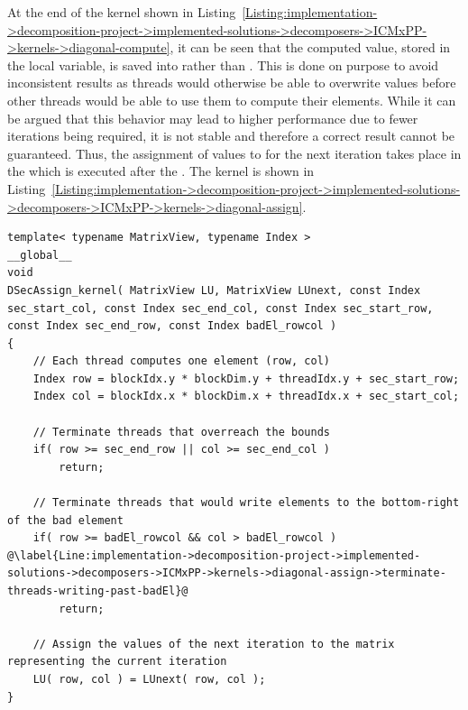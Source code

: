 At the end of the kernel shown in Listing~\ref{Listing:implementation->decomposition-project->implemented-solutions->decomposers->ICMxPP->kernels->diagonal-compute}, it can be seen that the computed value, stored in the  local variable, is saved into  rather than . This is done on purpose to avoid inconsistent results as threads would otherwise be able to overwrite values before other threads would be able to use them to compute their elements. While it can be argued that this behavior may lead to higher performance due to fewer iterations being required, it is not stable and therefore a correct result cannot be guaranteed. Thus, the assignment of values to  for the next iteration takes place in the  which is executed after the . The  kernel is shown in Listing~\ref{Listing:implementation->decomposition-project->implemented-solutions->decomposers->ICMxPP->kernels->diagonal-assign}.

\begin{lstlisting}[caption={The implementation of the \code{DSecAssign\_kernel()} kernel that assigns values of the next iteration to the matrix representing the current iteration. Note that the matrices are passed using their views and the indices are copied to the local memory of each thread.},label={Listing:implementation->decomposition-project->implemented-solutions->decomposers->ICMxPP->kernels->diagonal-assign},escapechar=@]
template< typename MatrixView, typename Index >
__global__
void
DSecAssign_kernel( MatrixView LU, MatrixView LUnext, const Index sec_start_col, const Index sec_end_col, const Index sec_start_row, const Index sec_end_row, const Index badEl_rowcol )
{
	// Each thread computes one element (row, col)
	Index row = blockIdx.y * blockDim.y + threadIdx.y + sec_start_row;
	Index col = blockIdx.x * blockDim.x + threadIdx.x + sec_start_col;
	
	// Terminate threads that overreach the bounds
	if( row >= sec_end_row || col >= sec_end_col )
		return;
	
	// Terminate threads that would write elements to the bottom-right of the bad element
	if( row >= badEl_rowcol && col > badEl_rowcol ) @\label{Line:implementation->decomposition-project->implemented-solutions->decomposers->ICMxPP->kernels->diagonal-assign->terminate-threads-writing-past-badEl}@
		return;
	
	// Assign the values of the next iteration to the matrix representing the current iteration
	LU( row, col ) = LUnext( row, col );
}
\end{lstlisting}

